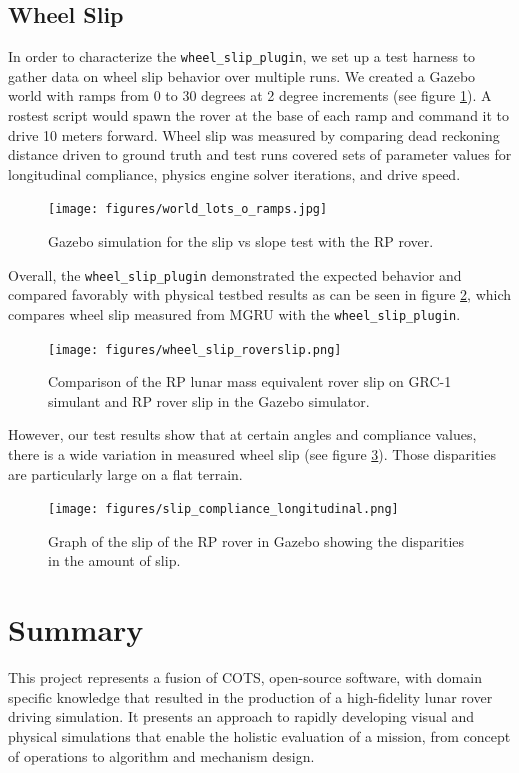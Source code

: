 \documentclass[twocolumn,letterpaper]{IEEEAerospaceCLS}  %
\begin{document}
\subsection{Wheel Slip}
In order to characterize the \texttt{wheel\_slip\_plugin}, we set up a test harness to gather data on wheel slip behavior over multiple runs. 
We created a Gazebo world with ramps from 0 to 30 degrees at 2 degree increments (see figure \ref{fig:simulationramps}). 
A rostest script would spawn the rover at the base of each ramp and command it to drive 10 meters forward.
Wheel slip was measured by comparing dead reckoning distance driven to ground truth and test runs covered sets of parameter values for longitudinal compliance, physics engine solver iterations, and drive speed. 
\begin{figure}[h!]
	\texttt{[image: figures/world\_lots\_o\_ramps.jpg]}
   	\caption{Gazebo simulation for the slip vs slope test with the RP rover.}
    \label{fig:simulationramps}
\end{figure}
Overall, the \texttt{wheel\_slip\_plugin} demonstrated the expected behavior and compared favorably with physical testbed results as can be seen in figure \ref{fig:wheelsliptuningchart}, which compares wheel slip measured from MGRU with the  \texttt{wheel\_slip\_plugin}. 
\begin{figure}[h!]
	\texttt{[image: figures/wheel\_slip\_roverslip.png]}
   	\caption{Comparison of the RP lunar mass equivalent rover slip on GRC-1 simulant and RP rover slip in the Gazebo simulator.}
    \label{fig:wheelsliptuningchart}
\end{figure}

However, our test results show that at certain angles and compliance values, there is a wide variation in measured wheel slip (see figure \ref{fig:slipdisparities}). Those disparities are particularly large on a flat terrain.
\begin{figure}[h!]
	\texttt{[image: figures/slip\_compliance\_longitudinal.png]}
   	\caption{Graph of the slip of the RP rover in Gazebo showing the disparities in the amount of slip.}
    \label{fig:slipdisparities}
\end{figure}

\section{Summary}

This project represents a fusion of COTS, open-source software, with domain specific knowledge that resulted in the production of a high-fidelity lunar rover driving simulation. It presents an approach to rapidly developing visual and physical simulations that enable the holistic evaluation of a mission, from concept of operations to algorithm and mechanism design.
\end{document}
